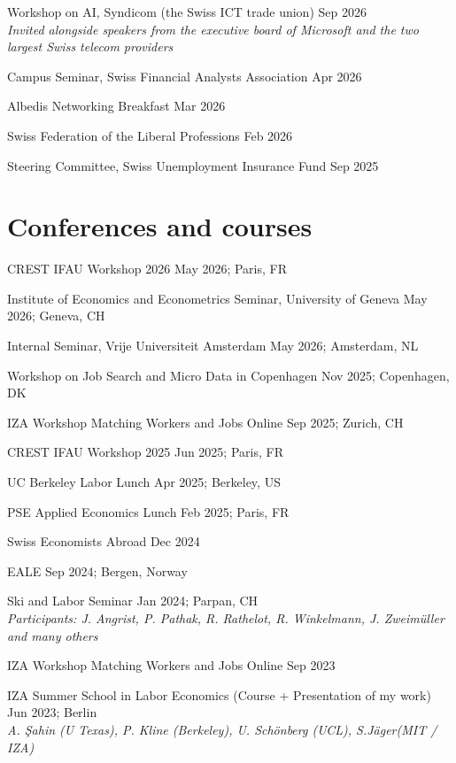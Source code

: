 \documentclass[letter, 11pt]{res}
\begin{document}
\begin{resume}
Workshop on AI, Syndicom (the Swiss ICT trade union) \hfill Sep 2026\\
\textit{Invited alongside speakers from the executive board of Microsoft and the two largest Swiss telecom providers}

Campus Seminar, Swiss Financial Analysts Association \hfill Apr 2026

Albedis Networking Breakfast \hfill Mar 2026

Swiss Federation of the Liberal Professions \hfill Feb 2026

Steering Committee, Swiss Unemployment Insurance Fund \hfill Sep 2025

\vspace{0.5cm}
\section{Conferences and courses}
\vspace{1mm}

CREST IFAU Workshop 2026 \hfill May 2026; Paris, FR

Institute of Economics and Econometrics Seminar, University of Geneva \hfill May 2026; Geneva, CH

Internal Seminar, Vrije Universiteit Amsterdam \hfill May 2026; Amsterdam, NL

Workshop on Job Search and Micro Data in Copenhagen \hfill Nov 2025; Copenhagen, DK

IZA Workshop Matching Workers and Jobs Online \hfill Sep 2025; Zurich, CH

CREST IFAU Workshop 2025 \hfill Jun 2025; Paris, FR

UC Berkeley Labor Lunch \hfill Apr 2025; Berkeley, US

PSE Applied Economics Lunch \hfill Feb 2025; Paris, FR

Swiss Economists Abroad \hfill Dec 2024

EALE \hfill Sep 2024; Bergen, Norway

Ski and Labor Seminar \hfill Jan 2024; Parpan, CH\\
\textit{Participants: J. Angrist, P. Pathak, R. Rathelot, R. Winkelmann, J. Zweimüller and many others}

IZA Workshop Matching Workers and Jobs Online \hfill Sep 2023

IZA Summer School in Labor Economics (Course + Presentation of my work) \hfill Jun 2023; Berlin\\
\textit{A. Şahin (U Texas), P. Kline (Berkeley), U. Schönberg (UCL), S.Jäger(MIT / IZA)}


\end{resume}
\end{document}
